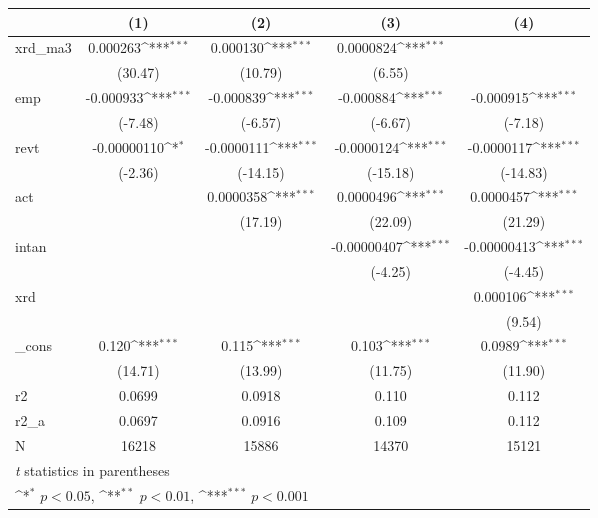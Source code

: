 {
\def\sym#1{\ifmmode^{#1}\else\(^{#1}\)\fi}
\begin{tabular}{l*{4}{c}}
\hline\hline
            &\multicolumn{1}{c}{(1)}         &\multicolumn{1}{c}{(2)}         &\multicolumn{1}{c}{(3)}         &\multicolumn{1}{c}{(4)}         \\
\hline
xrd\_ma3     &    0.000263\sym{***}&    0.000130\sym{***}&   0.0000824\sym{***}&                     \\
            &     (30.47)         &     (10.79)         &      (6.55)         &                     \\
[1em]
emp         &   -0.000933\sym{***}&   -0.000839\sym{***}&   -0.000884\sym{***}&   -0.000915\sym{***}\\
            &     (-7.48)         &     (-6.57)         &     (-6.67)         &     (-7.18)         \\
[1em]
revt        & -0.00000110\sym{*}  &  -0.0000111\sym{***}&  -0.0000124\sym{***}&  -0.0000117\sym{***}\\
            &     (-2.36)         &    (-14.15)         &    (-15.18)         &    (-14.83)         \\
[1em]
act         &                     &   0.0000358\sym{***}&   0.0000496\sym{***}&   0.0000457\sym{***}\\
            &                     &     (17.19)         &     (22.09)         &     (21.29)         \\
[1em]
intan       &                     &                     & -0.00000407\sym{***}& -0.00000413\sym{***}\\
            &                     &                     &     (-4.25)         &     (-4.45)         \\
[1em]
xrd         &                     &                     &                     &    0.000106\sym{***}\\
            &                     &                     &                     &      (9.54)         \\
[1em]
\_cons      &       0.120\sym{***}&       0.115\sym{***}&       0.103\sym{***}&      0.0989\sym{***}\\
            &     (14.71)         &     (13.99)         &     (11.75)         &     (11.90)         \\
\hline
r2          &      0.0699         &      0.0918         &       0.110         &       0.112         \\
r2\_a        &      0.0697         &      0.0916         &       0.109         &       0.112         \\
N           &       16218         &       15886         &       14370         &       15121         \\
\hline\hline
\multicolumn{5}{l}{\footnotesize \textit{t} statistics in parentheses}\\
\multicolumn{5}{l}{\footnotesize \sym{*} \(p<0.05\), \sym{**} \(p<0.01\), \sym{***} \(p<0.001\)}\\
\end{tabular}
}
